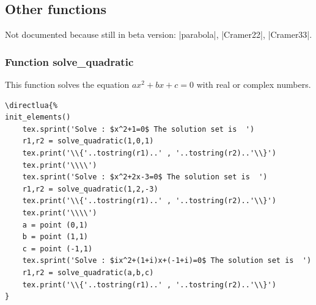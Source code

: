 \subsection{Other functions} %
\label{sub:other_functions}

Not documented because still in beta version: |parabola|, |Cramer22|, |Cramer33|.


\subsubsection{Function solve\_quadratic} %
\label{ssub:function_solve__quadratic}

This function solves the equation $ax^2+bx+c= 0$ with real or complex numbers.

\begin{minipage}{.6\textwidth}
\begin{Verbatim}
\directlua{%
init_elements()
    tex.sprint('Solve : $x^2+1=0$ The solution set is  ')
    r1,r2 = solve_quadratic(1,0,1)
    tex.print('\\{'..tostring(r1)..' , '..tostring(r2)..'\\}')
    tex.print('\\\\')
    tex.sprint('Solve : $x^2+2x-3=0$ The solution set is  ')
    r1,r2 = solve_quadratic(1,2,-3)
    tex.print('\\{'..tostring(r1)..' , '..tostring(r2)..'\\}')
    tex.print('\\\\')
    a = point (0,1)
    b = point (1,1)
    c = point (-1,1)
    tex.sprint('Solve : $ix^2+(1+i)x+(-1+i)=0$ The solution set is  ')
    r1,r2 = solve_quadratic(a,b,c)
    tex.print('\\{'..tostring(r1)..' , '..tostring(r2)..'\\}')
}
\end{Verbatim}
\end{minipage}



\endinput

